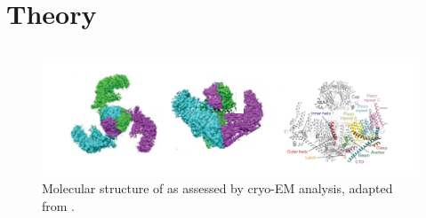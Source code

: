 \section{Theory}

\subsection{\Piezo{}}

\begin{figure}
	\centering
	\includegraphics[width=0.6\linewidth]{PiezoMolecule.png}
	\caption{Molecular structure of \Piezo{} as assessed by cryo-EM analysis, adapted from \cite{Saotome2018, Zhao2018}.}
	\label{pic:Piezo}
\end{figure}

